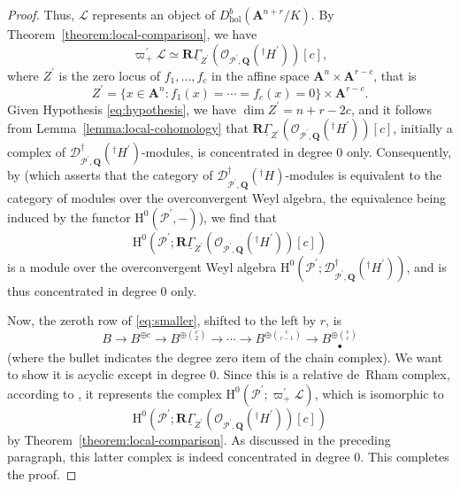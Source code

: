 \documentclass{amsart}
\numberwithin{equation}{section}
\theoremstyle{plain}
\theoremstyle{definition}
\renewcommand{\mathbb}{\mathbf}
\begin{document}
\begin{proof}
Thus, \(\mathcal{L}\) represents an object of
\(D^{b}_{\mathrm{hol}}(\mathbb{A}^{n+r}/K)\). By
Theorem~\ref{theorem:local-comparison}, we have
\begin{equation*}
\varpi^{\prime}_{+} \mathcal{L} \simeq \mathbb{R}\underline{\Gamma}_{Z^{\prime}}(\mathcal{O}_{\mathcal{P}^{\prime}, \mathbb{Q}}({}^{\dagger}H^{\prime}))[c],
\end{equation*}
where \(Z^{\prime}\) is the zero locus of \(f_{1}, \ldots, f_{c}\) in
the affine space \(\mathbb{A}^{n} \times \mathbb{A}^{r-c}\),
that is
\[
Z^{\prime} = \{x \in \mathbb{A}^{n} : f_{1}(x) = \cdots = f_{c}(x) = 0\} \times \mathbb{A}^{r-c}.
\]
Given Hypothesis \eqref{eq:hypothesis}, we have
\(\dim Z^{\prime} = n + r - 2c\), and it follows from
Lemma~\ref{lemma:local-cohomology} that
\(\mathbb{R}\underline{\Gamma}_{Z^{\prime}}(\mathcal{O}_{\mathcal{P}^{\prime}, \mathbb{Q}}({}^{\dagger}H^{\prime}))[c]\),
initially a complex of
\(\mathscr{D}^{\dagger}_{\mathcal{P}^{\prime},\mathbb{Q}}({}^{\dagger}H^{\prime})\)-modules,
is concentrated in degree \(0\) only.  Consequently, by
\cite[Theorem~2.3]{baldassarri-berthelot:dwork-cohomology-for-singular-hypersurfaces}
(which asserts that the category of
\(\mathscr{D}^{\dagger}_{\mathcal{P}^{\prime},\mathbb{Q}}({}^{\dagger}H)\)-modules
is equivalent to the category of modules over the overconvergent Weyl
algebra, the equivalence being induced by the functor
\(\mathrm{H}^{0}(\mathcal{P}^{\prime},-)\)), we find that
\[
\mathrm{H}^{0}(\mathcal{P}^{\prime}; \mathbb{R}\underline{\Gamma}_{Z^{\prime}}(\mathcal{O}_{\mathcal{P}^{\prime}, \mathbb{Q}}({}^{\dagger}H^{\prime}))[c])
\]
is a module over the overconvergent Weyl algebra
\(\mathrm{H}^{0}(\mathcal{P}^{\prime};\mathscr{D}^{\dagger}_{\mathcal{P}^{\prime},\mathbb{Q}}({}^{\dagger}H^{\prime}))\),
and is thus concentrated in degree \(0\) only.

\medskip%
Now, the zeroth row of \eqref{eq:smaller}, shifted to the left by \(r\), is
\[
{B} \to B^{\oplus c} \to B^{\oplus \binom{c}{2}} \to \cdots \to B^{\oplus \binom{c}{c-1}} \to \underset{\bullet}{B^{\oplus \binom{c}{c}}}
\]
(where the bullet indicates the degree zero item of the chain
complex).  We want to show it is acyclic except in degree \(0\).  Since this is
a relative de~Rham complex,  according to
\cite[p.~197, Remark]{baldassarri-berthelot:dwork-cohomology-for-singular-hypersurfaces},
it represents the complex
\(\mathrm{H}^{0}(\mathcal{P}^{\prime}; \varpi^{\prime}_{+}\mathcal{L})\),
which is isomorphic to
\[
\mathrm{H}^{0}(\mathcal{P}^{\prime}; \mathbb{R} \underline{\Gamma}_{Z^{\prime}} (\mathcal{O}_{\mathcal{P}^{\prime}, \mathbb{Q}} ({}^{\dagger} H^{\prime})) [c])
\]
by Theorem~\ref{theorem:local-comparison}.  As discussed in the
preceding paragraph, this latter complex is indeed concentrated in
degree \(0\).  This completes the proof.
\end{proof}
\end{document}

